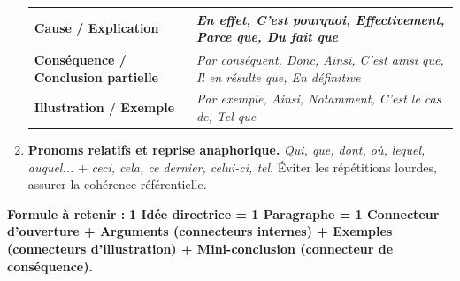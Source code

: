 \documentclass[11pt]{article}
\newcommand{\cle}[1]{{\popxbold\color{popdark}#1}}
\begin{document}
\begin{methode}
\begin{enumerate}
\begin{center}
\begin{tabularx}{\linewidth}{|l|X|}
        \textbf{Cause / Explication} & \emph{En effet, C'est pourquoi, Effectivement, Parce que, Du fait que} \\ \hline
        \textbf{Conséquence / Conclusion partielle} & \emph{Par conséquent, Donc, Ainsi, C'est ainsi que, Il en résulte que, En définitive} \\ \hline
        \textbf{Illustration / Exemple} & \emph{Par exemple, Ainsi, Notamment, C'est le cas de, Tel que} \\ \hline
        \end{tabularx}
        \end{center}
    \item \textbf{Pronoms relatifs et reprise anaphorique.} \emph{Qui, que, dont, où, lequel, auquel...} + \emph{ceci, cela, ce dernier, celui-ci, tel}. Éviter les répétitions lourdes, assurer la \cle{cohérence référentielle}.
\end{enumerate}
\textbf{Formule à retenir :} \textbf{1 Idée directrice = 1 Paragraphe = 1 Connecteur d'ouverture + Arguments (connecteurs internes) + Exemples (connecteurs d'illustration) + Mini-conclusion (connecteur de conséquence).}
\end{methode}
\end{document}

